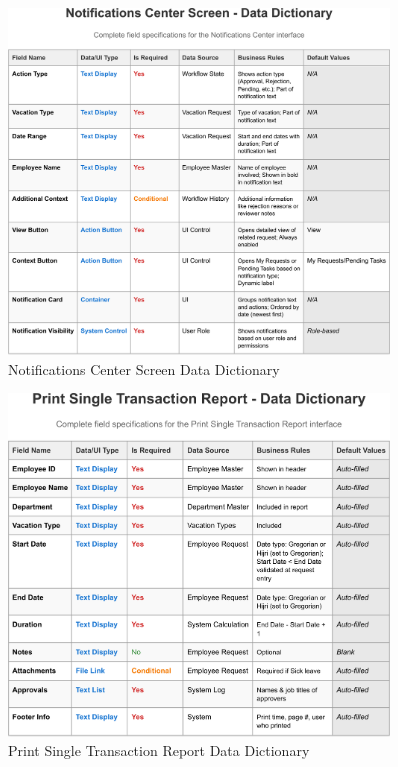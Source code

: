 \documentclass[12pt,a4paper]{article}
\begin{document}
\begin{figure}[H]
\centering
\includegraphics[width=0.9\textwidth]{Data-Dictionary/Screen-Data-Dictionaries/Notifications-Center-Screen-Data-Dictionary/Notifications-Center-Screen-Data-Dictionary-1.png}
\caption{Notifications Center Screen Data Dictionary}
\label{fig:notifications-center-data-dict}
\end{figure}

\begin{figure}[H]
\centering
\includegraphics[width=0.9\textwidth]{Data-Dictionary/Screen-Data-Dictionaries/Print-Single-Transaction-Report-Data-Dictionary/Print-Single-Transaction-Report-Data-Dictionary-1.png}
\caption{Print Single Transaction Report Data Dictionary}
\label{fig:print-single-transaction-data-dict}
\end{figure}
\end{document}
